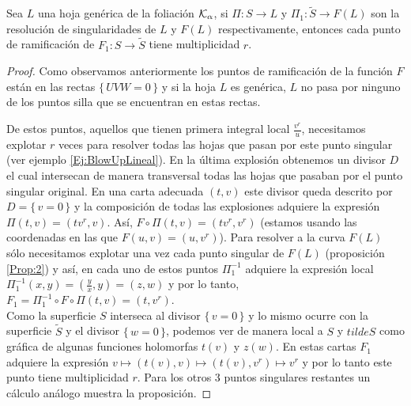 \begin{Proposicion}
\label{Prop:OrdenDeRamificacion}
Sea $L$ una hoja genérica de la foliación $\mathcal{K}_{\alpha}$, si $\Pi\colon S\rightarrow L$ y $\Pi_{1}\colon\tilde{S}\rightarrow F(L)$ son la resolución de singularidades de $L$ y $F(L)$ respectivamente, entonces cada punto de ramificación de $F_{1}\colon S\rightarrow\tilde{S}$ tiene multiplicidad $r$.
\end{Proposicion}
\begin{proof} 
Como observamos anteriormente los puntos de ramificación de la función $F$ están en las rectas $\{\,  UVW=0\,\}$ y si la hoja $L$ es genérica, $L$ no pasa por ninguno de los puntos silla que se encuentran en estas rectas.

 De estos puntos, aquellos que tienen primera integral local $\tfrac{v^{r}}{u}$, necesitamos explotar $r$ veces para resolver todas las hojas que pasan por este punto singular (ver ejemplo \ref{Ej:BlowUpLineal}). En la última explosión obtenemos un divisor $D$ el cual intersecan de manera transversal todas las hojas que pasaban por el punto singular original. En una carta adecuada $(t,v)$ este divisor queda descrito por $D=\{\, v=0\, \}$ y la composición de todas las explosiones adquiere la expresión $\Pi(t,v)=(tv^{r},v)$. Así, $F\circ\Pi(t,v)=(tv^{r},v^{r})$ (estamos usando las coordenadas en las que $F(u,v)=(u,v^{r})$). Para resolver a la curva $F(L)$ sólo necesitamos explotar una vez cada punto singular de $F(L)$ (proposición \ref{Prop:2}) y así, en cada uno de estos puntos $\Pi_{1}^{-1}$ adquiere la expresión local $\Pi_{1}^{-1}(x,y)=(\tfrac{y}{x},y)=(z,w)$ y por lo tanto, $F_{1}=\Pi_{1}^{-1}\circ F\circ\Pi(t,v)=(t,v^{r})$.\\

Como la superficie $S$ interseca al divisor $\{\, v=0\, \}$ y lo mismo ocurre con la superficie $\tilde{S}$ y el divisor $\{\, w=0\, \}$, podemos ver de manera local a $S$ y $tilde{S}$ como gráfica de algunas funciones holomorfas $t(v)$ y $z(w)$. En estas cartas $F_{1}$ adquiere la expresión $v\mapsto (t(v),v)\mapsto (t(v),v^{r})\mapsto v^{r}$ y por lo tanto este punto tiene multiplicidad $r$. Para los otros 3 puntos singulares restantes un cálculo análogo muestra la proposición.
\end{proof} 

